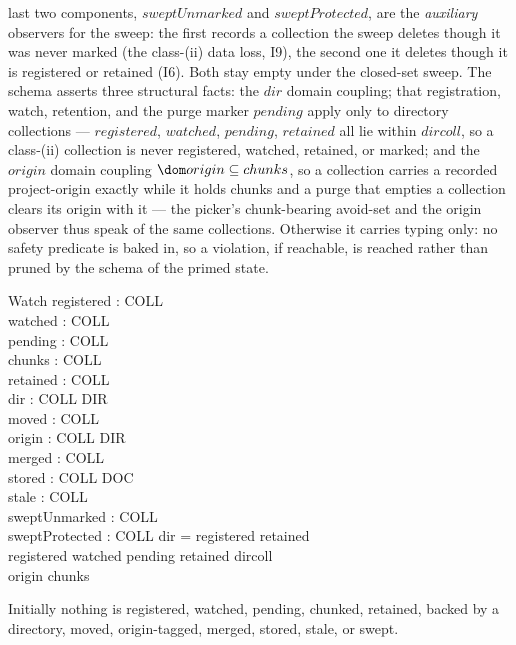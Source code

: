 \documentclass[a4paper]{article}
\begin{document}
last two components, $sweptUnmarked$ and $sweptProtected$, are the
\textit{auxiliary} observers for the sweep: the first records a collection the
sweep deletes though it was never marked (the class-(ii) data loss, I9), the
second one it deletes though it is registered or retained (I6).  Both stay empty
under the closed-set sweep.  The schema asserts three structural facts: the $dir$
domain coupling; that registration, watch, retention, and the purge marker
$pending$ apply only to directory collections --- $registered$, $watched$,
$pending$, $retained$ all lie within $dircoll$, so a class-(ii) collection is
never registered, watched, retained, or marked; and the $origin$ domain coupling
$\dom origin \subseteq chunks$, so a collection carries a recorded project-origin
exactly while it holds chunks and a purge that empties a collection clears its
origin with it --- the picker's chunk-bearing avoid-set and the origin observer
thus speak of the same collections.  Otherwise it carries typing
only: no safety predicate is baked in, so a violation, if reachable, is reached
rather than pruned by the schema of the primed state.

\begin{schema}{Watch}
  registered : \power COLL \\
  watched : \power COLL \\
  pending : \power COLL \\
  chunks : \power COLL \\
  retained : \power COLL \\
  dir : COLL \pfun DIR \\
  moved : \power COLL \\
  origin : COLL \pfun DIR \\
  merged : \power COLL \\
  stored : COLL \fun \power DOC \\
  stale : \power COLL \\
  sweptUnmarked : \power COLL \\
  sweptProtected : \power COLL
  \where
  \dom dir = registered \cup retained \\
  registered \cup watched \cup pending \cup retained \subseteq dircoll \\
  \dom origin \subseteq chunks
\end{schema}

Initially nothing is registered, watched, pending, chunked, retained, backed by
a directory, moved, origin-tagged, merged, stored, stale, or swept.
\end{document}
